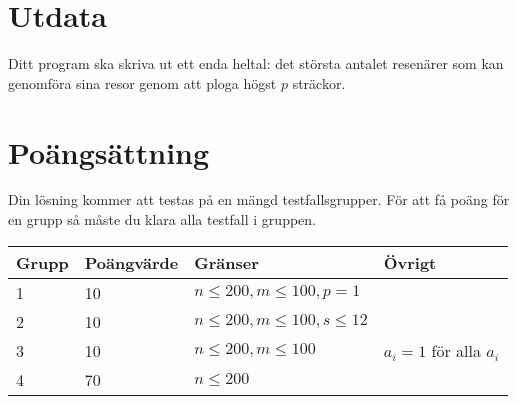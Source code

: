 \section*{Utdata}
Ditt program ska skriva ut ett enda heltal: det största antalet resenärer som kan genomföra sina resor genom att ploga högst $p$ sträckor.

\section*{Poängsättning}
Din lösning kommer att testas på en mängd testfallsgrupper. För att få poäng för en grupp så måste du klara alla testfall i gruppen.

\begin{tabular}{| l | l | l | l |}
\hline
Grupp & Poängvärde & Gränser & Övrigt \\ \hline
1     & 10         & $ n \le 200, m \le 100, p = 1$ &\\ \hline
2     & 10         & $ n \le 200, m \le 100, s \le 12 $ &\\ \hline
3     & 10          & $ n \le 200, m \le 100$ & $a_i = 1$ för alla $a_i$\\ \hline
4     & 70         & $ n \le 200$ &\\ \hline
\end{tabular}
